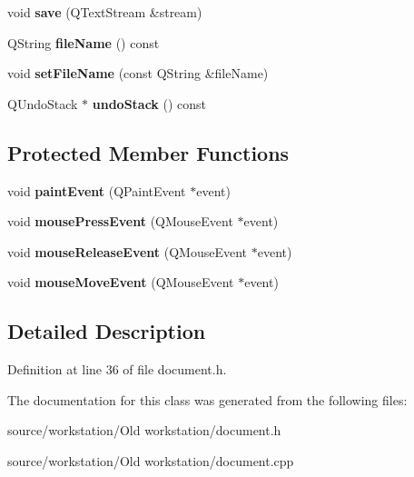 \begin{DoxyCompactItemize}
\item 
\hypertarget{class_document_a81bbdb9c43dc9f56c27a3c5ad89ec7c5}{void {\bfseries save} (Q\-Text\-Stream \&stream)}\label{class_document_a81bbdb9c43dc9f56c27a3c5ad89ec7c5}

\item 
\hypertarget{class_document_affda0b6d14cd48dd950af7be64190fe9}{Q\-String {\bfseries file\-Name} () const }\label{class_document_affda0b6d14cd48dd950af7be64190fe9}

\item 
\hypertarget{class_document_ac7505a8890c486740dcaec858a0034fb}{void {\bfseries set\-File\-Name} (const Q\-String \&file\-Name)}\label{class_document_ac7505a8890c486740dcaec858a0034fb}

\item 
\hypertarget{class_document_a2d94d214e05efd834d7aeb0191ddf518}{Q\-Undo\-Stack $\ast$ {\bfseries undo\-Stack} () const }\label{class_document_a2d94d214e05efd834d7aeb0191ddf518}

\end{DoxyCompactItemize}
\subsection*{Protected Member Functions}
\begin{DoxyCompactItemize}
\item 
\hypertarget{class_document_a52bc3fe5e2114539ba421ce8ad37d712}{void {\bfseries paint\-Event} (Q\-Paint\-Event $\ast$event)}\label{class_document_a52bc3fe5e2114539ba421ce8ad37d712}

\item 
\hypertarget{class_document_a9dd0710da6b37fea4e606fb4131f2a15}{void {\bfseries mouse\-Press\-Event} (Q\-Mouse\-Event $\ast$event)}\label{class_document_a9dd0710da6b37fea4e606fb4131f2a15}

\item 
\hypertarget{class_document_a98af9830915cca973527a84e6d67f8b5}{void {\bfseries mouse\-Release\-Event} (Q\-Mouse\-Event $\ast$event)}\label{class_document_a98af9830915cca973527a84e6d67f8b5}

\item 
\hypertarget{class_document_a1910d9a166c3f33ac2a785a6988ed989}{void {\bfseries mouse\-Move\-Event} (Q\-Mouse\-Event $\ast$event)}\label{class_document_a1910d9a166c3f33ac2a785a6988ed989}

\end{DoxyCompactItemize}


\subsection{Detailed Description}


Definition at line 36 of file document.\-h.



The documentation for this class was generated from the following files\-:\begin{DoxyCompactItemize}
\item 
source/workstation/\-Old workstation/document.\-h\item 
source/workstation/\-Old workstation/document.\-cpp\end{DoxyCompactItemize}
